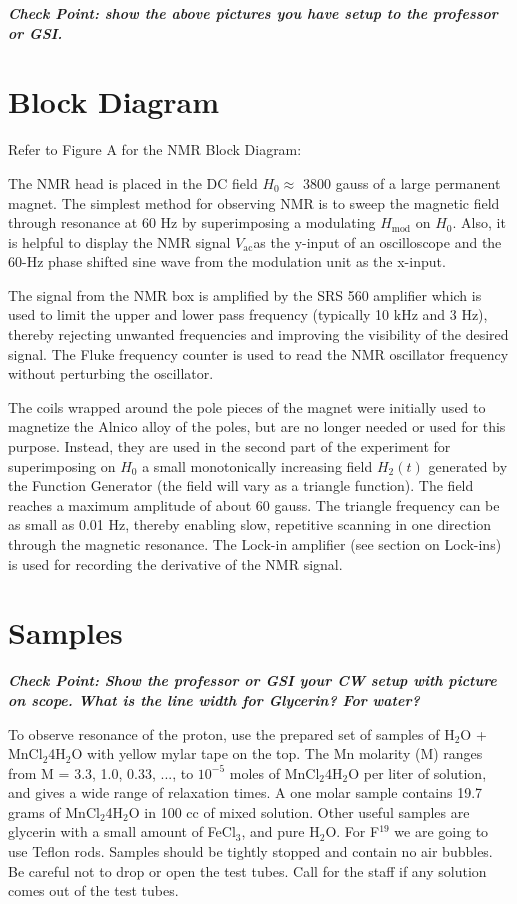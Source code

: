 \documentclass{../lab}
\begin{document}
\emph{\textbf{Check Point: show the above pictures you have setup to  the professor or GSI.}}

\section{Block Diagram}

Refer to Figure A for the NMR Block Diagram:

The NMR head is placed in the DC field $H_0 \approx$ 3800 gauss of a large permanent magnet. The simplest method for observing NMR is to sweep the magnetic field through resonance at 60 Hz by superimposing a modulating $H_\text{mod}$ on $H_0$. Also, it is helpful to display the NMR signal $V_\text{ac}$as the y-input of an oscilloscope and the 60-Hz phase shifted sine wave from the modulation unit as the x-input.

The signal from the NMR box is amplified by the SRS 560 amplifier which is used to limit the upper and lower pass frequency (typically 10 kHz and 3 Hz), thereby rejecting unwanted frequencies and improving the visibility of the desired signal. The Fluke frequency counter is used to read the NMR oscillator frequency without perturbing the oscillator.

The coils wrapped around the pole pieces of the magnet were initially used to magnetize the Alnico alloy of the poles, but are no longer needed or used for this purpose. Instead, they are used in the second part of the experiment for superimposing on $H_0$ a small monotonically increasing field $H_2(t)$ generated by the Function Generator (the field will vary as a triangle function). The field reaches a maximum amplitude of about 60 gauss. The triangle frequency can be as small as 0.01 Hz, thereby enabling slow, repetitive scanning in one direction through the magnetic resonance. The Lock-in amplifier (see section on Lock-ins) is used for recording the derivative of the NMR signal.

\section{Samples}

\emph{\textbf{Check Point: Show the professor or GSI your CW setup with picture on scope. What is the line width for Glycerin? For water?}}

To observe resonance of the proton, use the prepared set of samples of H$_2$O + MnCl$_2$4H$_2$O with yellow mylar tape on the top. The Mn molarity (M) ranges from M = 3.3, 1.0, 0.33, ..., to $10^{-5}$ moles of MnCl$_2$4H$_2$O per liter of solution, and gives a wide range of relaxation times. A one molar sample contains 19.7 grams of MnCl$_2$4H$_2$O in 100 cc of mixed solution. Other useful samples are glycerin with a small amount of FeCl$_3$, and pure H$_2$O. For F$^{19}$ we are going to use Teflon rods. Samples should be tightly stopped and contain no air bubbles. Be careful not to drop or open the test tubes. Call for the staff if any solution comes out of the test tubes.
\end{document}
